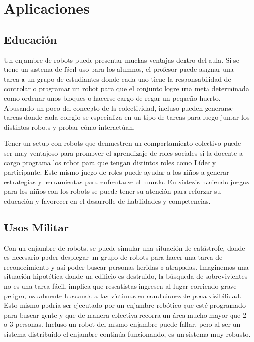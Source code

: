 
\chapter{Aplicaciones} %

\label{Chapter6} %



\section{Educación}

Un enjambre de robots puede presentar muchas ventajas dentro del aula. Si se tiene un sistema de fácil uso para los alumnos, el profesor puede asignar una tarea a un grupo de estudiantes donde cada uno tiene la responsabilidad de controlar o programar un robot para que el conjunto logre una meta determinada como ordenar unos bloques o hacerse cargo de regar un pequeño huerto. Abusando un poco del concepto de la colectividad, incluso pueden generarse tareas donde cada colegio se especializa en un tipo de tareas para luego juntar los distintos robots y probar cómo interactúan.

Tener un setup con robots que demuestren un comportamiento colectivo puede ser muy ventajoso para promover el aprendizaje de roles sociales si la docente a cargo programa los robot para que tengan distintos roles como Líder y participante. Este mismo juego de roles puede ayudar a los niños a generar estrategias y herramientas para enfrentarse al mundo. En síntesis haciendo juegos para los niños con los robots se puede tener su atención para reforzar su educación y favorecer en el desarrollo de habilidades y competencias. 

\section{Usos Militar}

Con un enjambre de robots, se puede simular una situación de catástrofe, donde es necesario poder desplegar un grupo de robots para hacer una tarea de reconocimiento y así poder buscar personas heridas o atrapadas.
Imaginemos una situación hipotética donde un edificio es destruido, la búsqueda de sobrevivientes no es una tarea fácil, implica que rescatistas ingresen al lugar corriendo grave peligro, usualmente buscando a las víctimas en condiciones de poca visibilidad. Esto mismo podría ser ejecutado por un enjambre robótico que esté programado para buscar gente y que de manera colectiva recorra un área mucho mayor que 2 o 3 personas. Incluso un robot del mismo enjambre puede fallar, pero al ser un sistema distribuido el enjambre continúa funcionando, es un sistema muy robusto.


